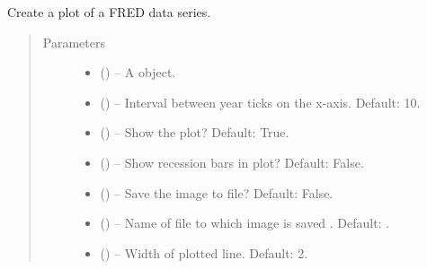 \documentclass[letterpaper,10pt,openany,oneside,english]{sphinxmanual}
\begin{document}
\begin{fulllineitems}
\label{\detokenize{additional_functions:fredpy.quickplot}}
Create a plot of a FRED data series.
\begin{quote}\begin{description}
\item[{Parameters}] \leavevmode\begin{itemize}
\item {} 
 ({\hyperref[\detokenize{series_class:fredpy.series}]{}}) -- A {\hyperref[\detokenize{series_class:fredpy.series}]{}} object.

\item {} 
 (\href{https://docs.python.org/2/library/functions.html\#int}{}) -- Interval between year ticks on the x-axis. Default: 10.

\item {} 
 (\href{https://docs.python.org/2/library/functions.html\#bool}{}) -- Show the plot? Default: True.

\item {} 
 (\href{https://docs.python.org/2/library/functions.html\#bool}{}) -- Show recession bars in plot? Default: False.

\item {} 
 (\href{https://docs.python.org/2/library/functions.html\#bool}{}) -- Save the image to file? Default: False.

\item {} 
 (\href{https://docs.python.org/2/library/string.html\#module-string}{}) -- Name of file to which image is saved . Default: .

\item {} 
 (\href{https://docs.python.org/2/library/functions.html\#float}{}) -- Width of plotted line. Default: 2.


\end{itemize}
\end{description}
\end{quote}
\end{fulllineitems}
\end{document}
